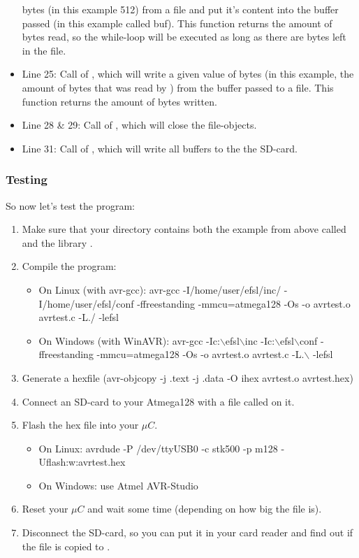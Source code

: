 \begin{itemize}
{		bytes (in this example 512) from a file and put it's content into
		the buffer passed (in this example called buf). This function returns
		the amount of bytes read, so the while-loop will be executed as long
		as there are bytes left in the file.}
	\item{Line 25: Call of , which will write a given value
		of bytes (in this example, the amount of bytes that was read
		by ) from the buffer passed to a file. This function returns
		the amount of bytes written.}
	\item{Line 28 \& 29: Call of , which will close the
		file-objects.}
	\item{Line 31: Call of , which will write all buffers to
		the the SD-card.}
\end{itemize}
\subsubsection{Testing}
So now let's test the program:
\begin{enumerate}
	\item
	{
		Make sure that your directory contains both the example from above
		called  and the library .
	}
	\item
	{	Compile the program:
		\begin{itemize}
			\item{On Linux (with avr-gcc): avr-gcc -I/home/user/efsl/inc/ 
				-I/home/user/efsl/conf -ffreestanding -mmcu=atmega128 -Os -o 
				avrtest.o avrtest.c -L./ -lefsl}
			\item{On Windows (with WinAVR): avr-gcc 
				-Ic:$\backslash$efsl$\backslash$inc
				-Ic:$\backslash$efsl$\backslash$conf 
				-ffreestanding -mmcu=atmega128 -Os -o
				avrtest.o avrtest.c -L.$\backslash$ -lefsl}
		\end{itemize}
	}
	\item{Generate a hexfile 
		(avr-objcopy -j .text -j .data -O ihex avrtest.o avrtest.hex)}
	\item{Connect an SD-card to your Atmega128 with a file called 
		 on it.}
	\item
	{
		Flash the hex file into your $\mu C$.
		\begin{itemize}
			\item{On Linux: avrdude -P /dev/ttyUSB0 -c stk500 -p m128 -Uflash:w:avrtest.hex}
			\item{On Windows: use Atmel AVR-Studio}
		\end{itemize}
	}
	\item{Reset your $\mu C$ and wait some time (depending on how big
		the file  is).}
	\item{Disconnect the SD-card, so you can put it in your card reader
		and find out if the file  is copied to 
		.}
\end{enumerate}
